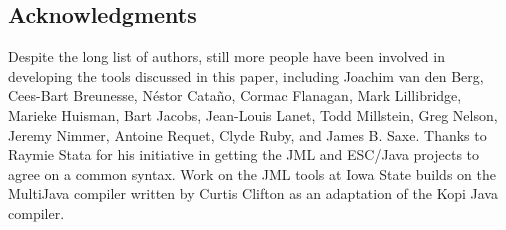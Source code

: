 \documentclass{entcs}
\begin{document}
\subsection*{Acknowledgments}

Despite the long list of authors, still more people have been involved
in developing the tools discussed in this paper, including
Joachim van den Berg,
Cees-Bart Breunesse,
N\'estor Cata{\~n}o,
Cormac Flanagan,
Mark Lillibridge,
Marieke Huisman,
Bart Jacobs,
Jean-Louis Lanet,
Todd Millstein,
Greg Nelson,
Jeremy Nimmer,
Antoine Requet,
Clyde Ruby,
and James B. Saxe.
Thanks to Raymie Stata for his initiative in getting the JML and
ESC/Java projects to agree on a common syntax.  Work on the JML tools
at Iowa State builds on the MultiJava compiler written by Curtis
Clifton as an adaptation of the Kopi Java compiler.

\small


\end{document}
